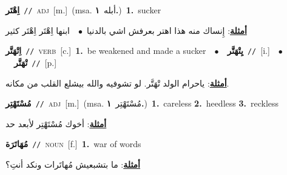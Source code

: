 \documentclass[10pt,a4paper,twoside]{article} %
\begin{document}
\begin{multicols}{2}
{{{{{{{{{{{{\setlength\topsep{0pt}\textbf{\foreignlanguage{arabic}{اِهْتَر}}\ {\color{gray}\texttt{//}\color{black}}\ \textsc{adj}\ [m.]\ \color{gray}(msa. \foreignlanguage{arabic}{أبله}~\foreignlanguage{arabic}{\textbf{١.}})\color{black}\ \textbf{1.}~sucker\  \begin{flushright}\color{gray}\foreignlanguage{arabic}{\textbf{\underline{\foreignlanguage{arabic}{أمثلة}}}: إِنساك منه هذا اهتر بعرفش اشي بالدنيا\ $\bullet$\ \  ابنها اِهْتَر اِهْتَر كثير}\end{flushright}\color{black}} \vspace{2mm}

{\setlength\topsep{0pt}\textbf{\foreignlanguage{arabic}{اِتْهَتَّر}}\ {\color{gray}\texttt{//}\color{black}}\ \textsc{verb}\ [c.]\ \textbf{1.}~be weakened and made a sucker\ \ $\bullet$\ \ \setlength\topsep{0pt}\textbf{\foreignlanguage{arabic}{يِتْهَتَّر}}\ {\color{gray}\texttt{//}\color{black}}\ [i.]\ \ $\bullet$\ \ \setlength\topsep{0pt}\textbf{\foreignlanguage{arabic}{تْهَتَّر}}\ {\color{gray}\texttt{//}\color{black}}\ [p.]\  \begin{flushright}\color{gray}\foreignlanguage{arabic}{\textbf{\underline{\foreignlanguage{arabic}{أمثلة}}}: ياحرام الولد تْهَتَّر. لو تشوفيه والله بيشلع القلب من مكانه.}\end{flushright}\color{black}} \vspace{2mm}

{\setlength\topsep{0pt}\textbf{\foreignlanguage{arabic}{مُسْتَهْتِر}}\ {\color{gray}\texttt{//}\color{black}}\ \textsc{adj}\ [m.]\ \color{gray}(msa. \foreignlanguage{arabic}{مُسْتَهْتِر}~\foreignlanguage{arabic}{\textbf{١.}})\color{black}\ \textbf{1.}~careless  \textbf{2.}~heedless  \textbf{3.}~reckless\  \begin{flushright}\color{gray}\foreignlanguage{arabic}{\textbf{\underline{\foreignlanguage{arabic}{أمثلة}}}: أخوك مُسْتَهْتِر لأبعد حد}\end{flushright}\color{black}} \vspace{2mm}

{\setlength\topsep{0pt}\textbf{\foreignlanguage{arabic}{مُهَاتَرَة}}\ {\color{gray}\texttt{//}\color{black}}\ \textsc{noun}\ [f.]\ \textbf{1.}~war of words\  \begin{flushright}\color{gray}\foreignlanguage{arabic}{\textbf{\underline{\foreignlanguage{arabic}{أمثلة}}}: ما بتشبعيش مُهاتَرات ونكد أنتِ؟}\end{flushright}\color{black}} \vspace{2mm}

}}}}}}}}}}}
\end{multicols}
\end{document}
